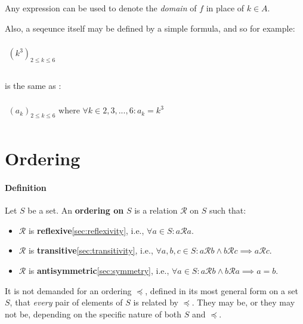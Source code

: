 Any expression can be used to denote the \textit{domain} of $f$ in
place of $k \in A$.

Also, a seqeunce itself may be defined by a simple formula, and so for
example:

\begin{math}
  \begin{array}{c}
    \\
    (k^3)_{2 \leq k \leq 6} \\
    \\
  \end{array}
\end{math}

is the same as :

\begin{math}
  \begin{array}{c}
    \\
    (a_k)_{2 \leq k \leq 6} \text{ where } \forall k \in {2,3, ..., 6}: a_k = k^3
    \\
  \end{array}
\end{math}


\newpage
\section{Ordering}
\label{sec:ordering}

\paragraph{Definition}

Let $S$ be a set. An \textbf{ordering on} $S$ is a relation
$\mathcal{R}$ on $S$ such that:

\begin{itemize}
\item $\mathcal{R}$ is \textbf{reflexive}\ref{sec:reflexivity}, i.e.,
  $\forall a \in S: a \mathcal{R} a$.
\item $\mathcal{R}$ is \textbf{transitive}\ref{sec:transitivity},
  i.e.,
  $\forall a, b, c \in S: a \mathcal{R} b \land b \mathcal{R} c
  \implies a \mathcal{R} c$.
\item $\mathcal{R}$ is \textbf{antisymmetric}\ref{sec:symmetry}, i.e.,
  $\forall a \in S : a \mathcal{R} b \land b \mathcal{R} a \implies a
  = b$.
\end{itemize}

It is not demanded for an ordering $\preceq$, defined in its most
general form on a set $S$, that \textit{every} pair of elements of $S$
is related by $\preceq$. They may be, or they may not be, depending on
the specific nature of both $S$ and $\preceq$.


